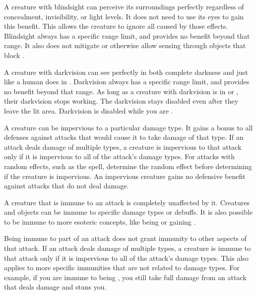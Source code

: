         A creature with blindsight can perceive its surroundings perfectly regardless of concealment, invisibility, or light levels.
        It does not need to use its eyes to gain this benefit.
        This allows the creature to ignore all  caused by those effects.
        Blindsight always has a specific range limit, and provides no benefit beyond that range.
        It also does not mitigate  or otherwise allow sensing through objects that block .

        A creature with darkvision can see perfectly in both complete darkness and  just like a human does in .
        Darkvision always has a specific range limit, and provides no benefit beyond that range.
        As long as a creature with darkvision is in  or , their darkvision stops working.
        The darkvision  stays disabled even after they leave the lit area.
        Darkvision is disabled while you are \dazzled.

        A creature can be impervious to a particular damage type.
        It gains a  bonus to all defenses against attacks that would cause it to take damage of that type.
        If an attack deals damage of multiple types, a creature is impervious to that attack only if it is impervious to all of the attack's damage types.
        For attacks with random effects, such as the  spell, determine the random effect before determining if the creature is impervious.
        An impervious creature gains no defensive benefit against attacks that do not deal damage.

        A creature that is immune to an attack is completely unaffected by it.
        Creatures and objects can be immune to specific damage types or debuffs.
        It is also possible to be immune to more esoteric concepts, like being \grappled or gaining .

        Being immune to part of an attack does not grant immunity to other aspects of that attack.
        If an attack deals damage of multiple types, a creature is immune to that attack only if it is impervious to all of the attack's damage types.
        This also applies to more specific immunities that are not related to damage types.
        For example, if you are immune to being \stunned, you still take full damage from an attack that deals damage and stuns you.

